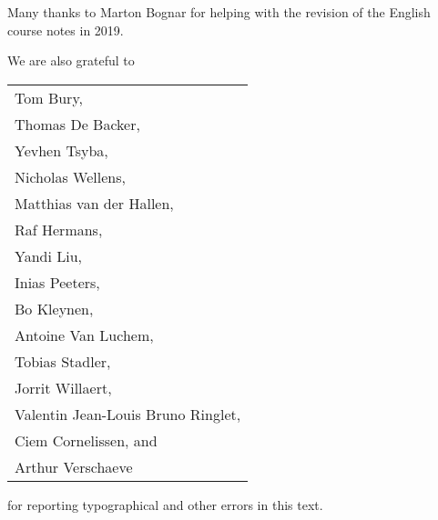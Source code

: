 Many thanks to Marton Bognar for helping with the revision of the 
English course notes in 2019.

We are also grateful to 
\begin{center}
\begin{tabular}{l}
Tom Bury,  \\
Thomas De Backer,  \\
Yevhen Tsyba, \\
Nicholas Wellens, \\
Matthias van der Hallen, \\
Raf Hermans, \\
Yandi Liu, \\
Inias Peeters, \\
Bo Kleynen, \\
Antoine Van Luchem, \\
Tobias Stadler, \\
Jorrit Willaert, \\
Valentin Jean-Louis Bruno Ringlet, \\
Ciem Cornelissen, and \\
Arthur Verschaeve
\end{tabular}
\end{center}
for reporting typographical and other errors in this text.

